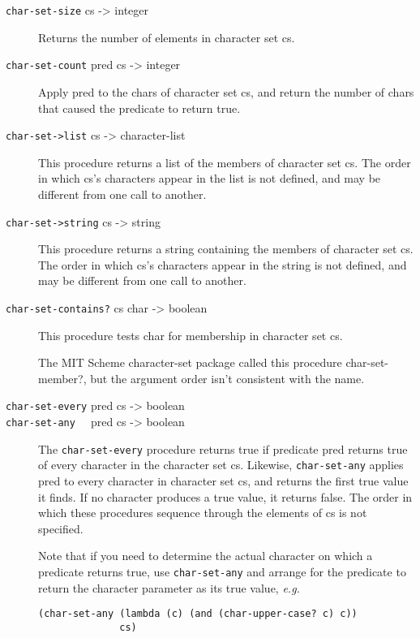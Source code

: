 \begin{description}
\item[ \href{}{} \texttt{char-set-size} cs -\textgreater{} integer ]
Returns the number of elements in character set cs.
\item[ \href{}{} \texttt{char-set-count} pred cs -\textgreater{} integer
]
Apply pred to the chars of character set cs, and return the number of
chars that caused the predicate to return true.
\item[ \href{}{} \texttt{char-set-\textgreater{}list} cs -\textgreater{}
character-list ]
This procedure returns a list of the members of character set cs. The
order in which cs's characters appear in the list is not defined, and
may be different from one call to another.
\item[ \href{}{} \texttt{char-set-\textgreater{}string} cs
-\textgreater{} string ]
This procedure returns a string containing the members of character set
cs. The order in which cs's characters appear in the string is not
defined, and may be different from one call to another.
\item[ \href{}{} \texttt{char-set-contains?} cs char -\textgreater{}
boolean ]
This procedure tests char for membership in character set cs.

The MIT Scheme character-set package called this procedure
char-set-member?, but the argument order isn't consistent with the name.
\item[ \href{}{} \href{}{} \texttt{char-set-every} pred cs
-\textgreater{} boolean\\
\texttt{char-set-any~~} pred cs -\textgreater{} boolean ]
The \texttt{char-set-every} procedure returns true if predicate pred
returns true of every character in the character set cs. Likewise,
\texttt{char-set-any} applies pred to every character in character set
cs, and returns the first true value it finds. If no character produces
a true value, it returns false. The order in which these procedures
sequence through the elements of cs is not specified.

Note that if you need to determine the actual character on which a
predicate returns true, use \texttt{char-set-any} and arrange for the
predicate to return the character parameter as its true value,
\emph{e.g.}

\begin{verbatim}
(char-set-any (lambda (c) (and (char-upper-case? c) c)) 
              cs)
\end{verbatim}
\end{description}

